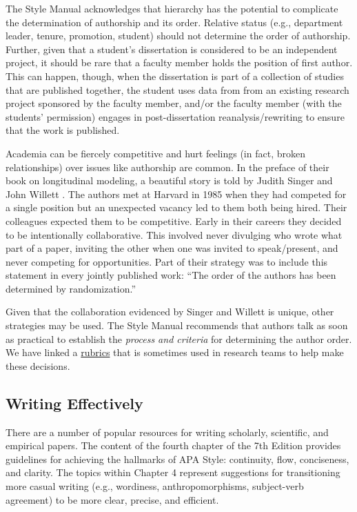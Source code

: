 \documentclass[
  11pt,
]{book}
\begin{document}
The Style Manual acknowledges that hierarchy has the potential to complicate the determination of authorship and its order. Relative status (e.g., department leader, tenure, promotion, student) should not determine the order of authorship. Further, given that a student's dissertation is considered to be an independent project, it should be rare that a faculty member holds the position of first author. This can happen, though, when the dissertation is part of a collection of studies that are published together, the student uses data from from an existing research project sponsored by the faculty member, and/or the faculty member (with the students' permission) engages in post-dissertation reanalysis/rewriting to ensure that the work is published.

Academia can be fiercely competitive and hurt feelings (in fact, broken relationships) over issues like authorship are common. In the preface of their book on longitudinal modeling, a beautiful story is told by Judith Singer and John Willett \citeyearpar{singer_applied_2003}. The authors met at Harvard in 1985 when they had competed for a single position but an unexpected vacancy led to them both being hired. Their colleagues expected them to be competitive. Early in their careers they decided to be intentionally collaborative. This involved never divulging who wrote what part of a paper, inviting the other when one was invited to speak/present, and never competing for opportunities. Part of their strategy was to include this statement in every jointly published work: ``The order of the authors has been determined by randomization.''

Given that the collaboration evidenced by Singer and Willett \citeyearpar{singer_applied_2003} is unique, other strategies may be used. The Style Manual recommends that authors talk as soon as practical to establish the \emph{process and criteria} for determining the author order. We have linked a \href{https://github.com/lhbikos/TransformingResearchMethods/blob/main/Authorship\%20Rubric220721.xlsx}{rubrics} that is sometimes used in research teams to help make these decisions.

\hypertarget{writing-effectively}{%
\subsection{Writing Effectively}\label{writing-effectively}}

There are a number of popular resources for writing scholarly, scientific, and empirical papers. The content of the fourth chapter of the 7th Edition provides guidelines for achieving the hallmarks of APA Style: continuity, flow, conciseness, and clarity. The topics within Chapter 4 represent suggestions for transitioning more casual writing (e.g., wordiness, anthropomorphisms, subject-verb agreement) to be more clear, precise, and efficient.
\end{document}
